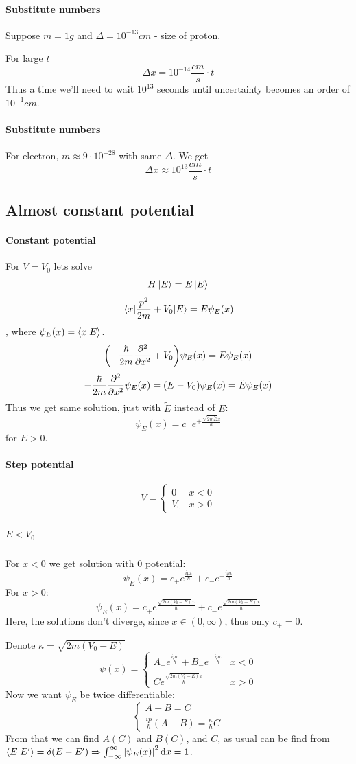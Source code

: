 \paragraph{Substitute numbers}
Suppose $m=1g$ and $\Delta =10^{-13} cm$ - size of proton.

For large $t$
$$\Delta x = 10^{-14}\frac{cm}{s} \cdot t$$
Thus a time we'll need to wait $10^{13}$ seconds until uncertainty becomes an order of $10^{-1} cm$.

\paragraph{Substitute numbers}
For electron, $m\approx 9 \cdot 10^{-28}$ with same $\Delta$. We get
$$\Delta x \approx 10^{13}\frac{cm}{s} \cdot t$$
\subsection{Almost constant potential}
\paragraph{Constant potential}
For $V=V_0$ lets solve
$$H\ket{E} = E\ket{E}$$
$$\mel{x}{\frac{p^2}{2m}+V_0}{E} = E\psi_E(x)$$
, where $\psi_E(x) = \braket{x}{E}$.
$$\qty(-\frac{\hbar}{2m}\pdv[2]{x} + V_0) \psi_E(x) = E\psi_E(x)$$
$$-\frac{\hbar}{2m}\pdv[2]{x}  \psi_E(x) = (E-V_0)\psi_E(x) = \tilde{E} \psi_E(x)$$
Thus we get same solution, just with $\tilde{E}$ instead of $E$:
$$\psi_E(x) = c_{\pm}e^{\pm\frac{\sqrt{2m\tilde{E}}x}{\hbar}}$$
for $\tilde{E}>0$.
\paragraph{Step potential}
$$V = \begin{cases}
0&x<0\\V_0 & x>0
\end{cases}$$
\subparagraph{$E<V_0$}
For $x<0$ we get solution with $0$ potential:
$$\psi_E(x) = c_+ e^{\frac{ipx}{\hbar}} + c_- e^{-\frac{ipx}{\hbar}}$$
For $x>0$:
$$\psi_E(x) = c_+ e^{\frac{\sqrt{2m(V_0-E)}x }{\hbar}} + c_- e^{\frac{\sqrt{2m(V_0-E)}x }{\hbar}}$$
Here, the solutions don't diverge, since $x\in(0, \infty)$, thus only $c_+ = 0$.

Denote $\kappa = \sqrt{2m(V_0-E)}$
$$\psi(x) = \begin{cases}
A_+ e^{\frac{ipx}{\hbar}} + B_- e^{-\frac{ipx}{\hbar}} & x<0\\
C e^{\frac{\sqrt{2m(V_0-E)}x }{\hbar}} & x> 0
\end{cases}$$
Now we want $\psi_E$ be twice differentiable:
$$\begin{cases}
A+B=C\\
\frac{ip}{\hbar} (A-B) = \frac{\kappa}{\hbar} C
\end{cases}$$
From that we can find $A(C)$ and $B(C)$, and $C$, as usual can be find from $\braket{E}{E'}=\delta(E-E') \Rightarrow \int_{-\infty}^\infty \abs{\psi_E(x)}^2 \dd{x} = 1$.

